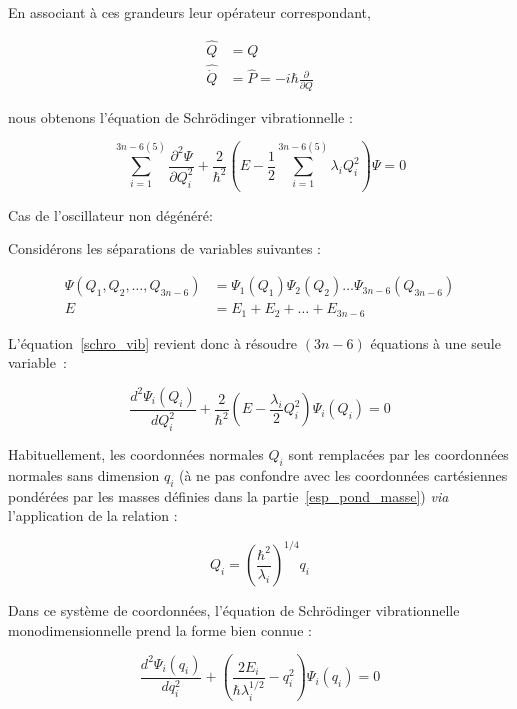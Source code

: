 En associant à ces grandeurs leur opérateur correspondant,

\begin{align}
\hat{Q} &= Q \\
\hat{\dot{Q}} &= \hat{P} = -i\hbar \frac{\partial}{\partial Q}
\end{align}

\noindent nous obtenons l'équation de Schr\"{o}dinger vibrationnelle :

\begin{equation}
\sum^{3n-6(5)}_{i=1} \frac{\partial^2 \Psi}{\partial Q^2_i} + \frac{2}{\hbar^2}\left(E - \frac{1}{2} \sum^{3n-6(5)}_{i=1} \lambda_i Q^2_i\right) \Psi = 0
\label{schro_vib}
\end{equation}

Cas de l'oscillateur non dégénéré:

Considérons les séparations de variables suivantes :

\begin{align}
	\Psi(Q_1,Q_2,\ldots,Q_{3n-6}) &= \Psi_1(Q_1) \Psi_2(Q_2)\ldots \Psi_{3n-6}(Q_{3n-6}) \\
	E &= E_1 +E_2 + \ldots + E_{3n-6}
\end{align}

L'équation~\ref{schro_vib} revient donc à résoudre $(3n-6)$ équations à une seule variable~:

\begin{equation}
 \frac{d^2 \Psi_i(Q_i)}{dQ^2_i} + \frac{2}{\hbar^2}\left(E - \frac{\lambda_i}{2} Q^2_i\right) \Psi_i\left(Q_i\right) = 0	
\end{equation}

Habituellement, les coordonnées normales $Q_i$ sont remplacées par les coordonnées normales sans dimension $q_i$ (à ne pas confondre avec les coordonnées cartésiennes pondérées par les masses définies dans la partie~\ref{esp_pond_masse}) \textit{via} l'application de la relation :

\begin{equation}
	Q_i = \left(\frac{\hbar^2}{\lambda_i}\right)^{1/4} q_i
\end{equation}

Dans ce système de coordonnées, l'équation de Schr\"{o}dinger vibrationnelle monodimensionnelle prend la forme bien connue :

\begin{equation}
	 \frac{d^2 \Psi_i(q_i)}{dq^2_i} + \left(\frac{2E_i}{\hbar\lambda^{1/2}_i} - q^2_i\right) \Psi_i\left(q_i\right) = 0	
\end{equation}

